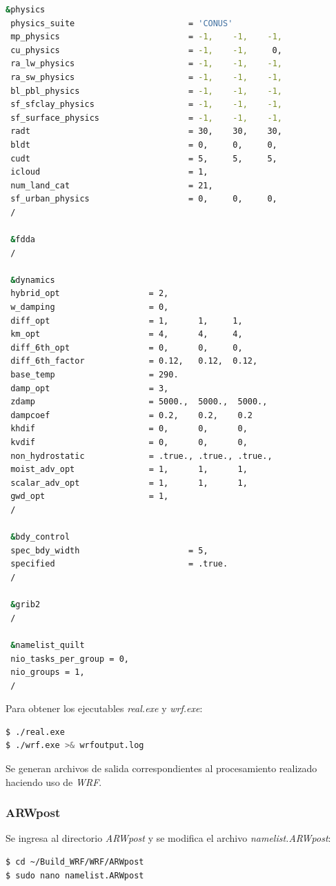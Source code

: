 \documentclass[12pt,letter]{article}
\begin{document}
\begin{lstlisting}[language=bash]
 &physics
 physics_suite                       = 'CONUS'
 mp_physics                          = -1,    -1,    -1,
 cu_physics                          = -1,    -1,     0,
 ra_lw_physics                       = -1,    -1,    -1,
 ra_sw_physics                       = -1,    -1,    -1,
 bl_pbl_physics                      = -1,    -1,    -1,
 sf_sfclay_physics                   = -1,    -1,    -1,
 sf_surface_physics                  = -1,    -1,    -1,
 radt                                = 30,    30,    30,
 bldt                                = 0,     0,     0,
 cudt                                = 5,     5,     5,
 icloud                              = 1,
 num_land_cat                        = 21,
 sf_urban_physics                    = 0,     0,     0,
 /

 &fdda
 /

 &dynamics
 hybrid_opt                  = 2, 
 w_damping                   = 0,
 diff_opt                    = 1,      1,     1,
 km_opt                      = 4,      4,     4,
 diff_6th_opt                = 0,      0,     0,
 diff_6th_factor             = 0.12,   0.12,  0.12,
 base_temp                   = 290.
 damp_opt                    = 3,
 zdamp                       = 5000.,  5000.,  5000.,
 dampcoef                    = 0.2,    0.2,    0.2
 khdif                       = 0,      0,      0,
 kvdif                       = 0,      0,      0,
 non_hydrostatic             = .true., .true., .true.,
 moist_adv_opt               = 1,      1,      1,     
 scalar_adv_opt              = 1,      1,      1,     
 gwd_opt                     = 1,
 /

 &bdy_control
 spec_bdy_width                      = 5,
 specified                           = .true.
 /

 &grib2
 /

 &namelist_quilt
 nio_tasks_per_group = 0,
 nio_groups = 1,
 /
\end{lstlisting}

\noindent Para obtener los ejecutables \textit{real.exe} y \textit{wrf.exe}:
\begin{lstlisting}[language=bash]
$ ./real.exe
$ ./wrf.exe >& wrfoutput.log
\end{lstlisting}
Se generan archivos de salida correspondientes al procesamiento realizado haciendo uso de \textit{WRF}.

\subsubsection*{ARWpost}
Se ingresa al directorio \textit{ARWpost} y se modifica el archivo \textit{namelist.ARWpost}:
\begin{lstlisting}
$ cd ~/Build_WRF/WRF/ARWpost
$ sudo nano namelist.ARWpost
\end{lstlisting}
\end{document}
